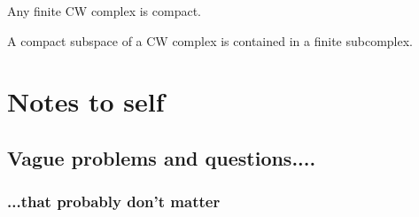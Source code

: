 \documentclass{MetricNotes2023}
\begin{document}
Any finite CW complex is compact.

\begin{proposition}\label{25004081110}
A compact subspace of a CW complex is contained in a finite subcomplex.
\end{proposition}

\section{Notes to self}\label{C}

\subsection{Vague problems and questions....}

\subsubsection{...that probably don't matter}
\end{document}

